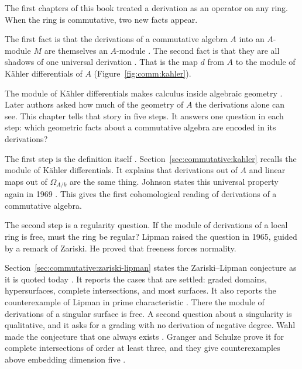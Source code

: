 
The first chapters of this book treated a derivation as an operator on any
ring. When the ring is commutative, two new facts appear.

The first fact is that the derivations of a commutative algebra $A$ into an
$A$-module $M$ are themselves an $A$-module \cite[p.~93]{Johnson1969Kahler}.
The second fact is that they are all shadows of one universal derivation
\cite[p.~93]{Johnson1969Kahler}. That is the map $d$ from $A$ to the module of
Kähler differentials of $A$ (Figure~\ref{fig:comm:kahler}).

The module of Kähler differentials makes calculus inside algebraic geometry
\cite[p.~93]{Johnson1969Kahler}. Later authors asked how much of the geometry
of $A$ the derivations alone can see. This chapter tells that story in five
steps. It answers one question in each step: which geometric facts about a
commutative algebra are encoded in its derivations?


The first step is the definition itself \cite[p.~92]{Johnson1969Kahler}.
Section~\ref{sec:commutative:kahler} recalls the module of Kähler
differentials. It explains that derivations out of $A$ and linear maps out of
$\Omega_{A/k}$ are the same thing. Johnson states this universal property
again in 1969 \cite[p.~92]{Johnson1969Kahler}. This gives the first
cohomological reading of derivations of a commutative algebra.

The second step is a regularity question.
If the module of derivations of a
local ring is free, must the ring be regular? Lipman raised the question in
1965, guided by a remark of Zariski. He proved that freeness forces
normality.

Section~\ref{sec:commutative:zariski-lipman} states the Zariski--Lipman
conjecture as it is quoted today \cite[Conjecture~1.1,
p.~270]{BiswasGurjarKolte2014}. It reports the cases that are settled: graded
domains, hypersurfaces, complete intersections, and most surfaces. It also
reports the counterexample of Lipman in prime characteristic
\cite[p.~116]{Graf2022LZPosChar}. There the module of derivations of a
singular surface is free. A second question about a singularity is
qualitative, and it asks for a grading with no derivation of negative degree.
Wahl made the conjecture that one always exists \cite[Conjecture,
p.~2]{GrangerSchulze2014Negative}. Granger and Schulze prove it for complete
intersections of order at least three, and they give counterexamples above
embedding dimension five \cite[Theorems~1.1 and 1.3,
p.~2]{GrangerSchulze2014Negative}.

